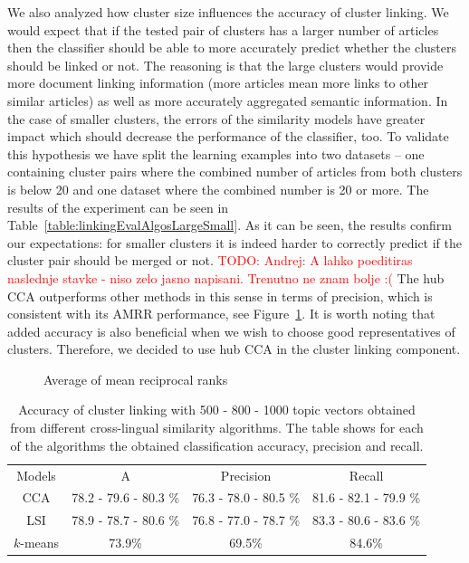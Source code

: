 \documentclass[twoside,11pt]{article}
\newcommand{\todo}[1]{\textcolor{red}{TODO: #1}}
\begin{document}
We also analyzed how cluster size influences the accuracy of cluster linking. We would expect that if the tested pair of clusters has a larger number of articles then the classifier should be able to more accurately predict whether the clusters should be linked or not. The reasoning is that the large clusters would provide more document linking information (more articles mean more links to other similar articles) as well as more accurately aggregated semantic information. In the case of smaller clusters, the errors of the similarity models have greater impact which should decrease the performance of the classifier, too. To validate this hypothesis we have split the learning examples into two datasets -- one containing cluster pairs where the combined number of articles from both clusters is below 20 and one dataset where the combined number is 20 or more. The results of the experiment can be seen in Table~\ref{table:linkingEvalAlgosLargeSmall}. As it can be seen, the results confirm our expectations: for smaller clusters it is indeed harder to correctly predict if the cluster pair should be merged or not. \todo{Andrej: A lahko poeditiras naslednje stavke - niso zelo jasno napisani. Trenutno ne znam bolje :(} The hub CCA outperforms other methods in this sense in terms of precision, which is consistent with its AMRR performance, see Figure~\ref{pic:AMRR}.
It is worth noting that added accuracy is also beneficial when we wish to choose good representatives of clusters. Therefore, we decided to use hub CCA in the cluster linking component.

\begin{figure}
\centering

\caption{Average of mean reciprocal ranks}
\label{pic:AMRR}
\end{figure}

\begin{table}[h]
\caption{Accuracy of cluster linking with 500 - 800 - 1000 topic vectors obtained from different cross-lingual similarity algorithms. The table shows for each of the algorithms the obtained classification accuracy, precision and recall.}
\label{table:linkingEvalAlgos}
\begin{center}
\begin{tabular}{|c|c|c|c|}
  \hline
  \cline{1-4}
  Models & A & Precision & Recall \\ \cline{1-4}
  CCA      & 78.2 - 79.6 - 80.3 \% & 76.3 - 78.0 - 80.5 \%  & 81.6 - 82.1 - 79.9 \%  \\ \cline{1-4}
  LSI      & 78.9 - 78.7 - 80.6 \%  & 76.8 - 77.0 - 78.7 \%  & 83.3 - 80.6 - 83.6 \%  \\ \cline{1-4}
 $k$-means & 73.9\phantom{ - 78.7 - 80.6 }\% & 69.5\phantom{ - 78.7 - 80.6 }\%  & 84.6\phantom{ - 78.7 - 80.6 }\%  \\ \cline{1-4}
\end{tabular}
\end{center}
\end{table}
\end{document}
